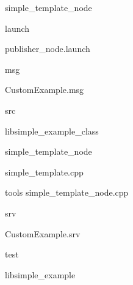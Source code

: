 \begin{DoxyEnumerate}
\begin{DoxyEnumerate}
\begin{DoxyEnumerate}
\begin{DoxyEnumerate}
\begin{DoxyEnumerate}
\item simple\+\_\+template\+\_\+node
\end{DoxyEnumerate}
\end{DoxyEnumerate}
\end{DoxyEnumerate}
\begin{DoxyEnumerate}
\item launch
\begin{DoxyEnumerate}
\item publisher\+\_\+node.\+launch
\end{DoxyEnumerate}
\end{DoxyEnumerate}
\begin{DoxyEnumerate}
\item msg
\begin{DoxyEnumerate}
\item Custom\+Example.\+msg
\end{DoxyEnumerate}
\end{DoxyEnumerate}
\begin{DoxyEnumerate}
\item src
\begin{DoxyEnumerate}
\item libsimple\+\_\+example\+\_\+class
\end{DoxyEnumerate}
\begin{DoxyEnumerate}
\item simple\+\_\+template\+\_\+node
\begin{DoxyEnumerate}
\item simple\+\_\+template.\+cpp
\end{DoxyEnumerate}
\end{DoxyEnumerate}
\begin{DoxyEnumerate}
\item tools simple\+\_\+template\+\_\+node.\+cpp
\end{DoxyEnumerate}
\end{DoxyEnumerate}
\begin{DoxyEnumerate}
\item srv
\begin{DoxyEnumerate}
\item Custom\+Example.\+srv
\end{DoxyEnumerate}
\end{DoxyEnumerate}
\begin{DoxyEnumerate}
\item test
\begin{DoxyEnumerate}
\item libsimple\+\_\+example
\begin{DoxyEnumerate}

\end{DoxyEnumerate}
\end{DoxyEnumerate}
\end{DoxyEnumerate}
\end{DoxyEnumerate}
\end{DoxyEnumerate}
